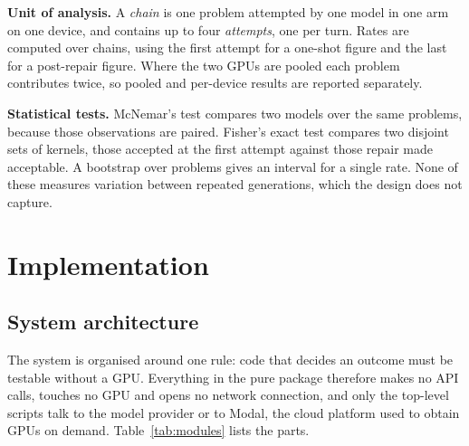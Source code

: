 \documentclass[12pt]{article}
\begin{document}
\textbf{Unit of analysis.} A \emph{chain} is one problem attempted by one model
in one arm on one device, and contains up to four \emph{attempts}, one per
turn. Rates are computed over chains, using the first attempt for a one-shot
figure and the last for a post-repair figure. Where the two GPUs are pooled
each problem contributes twice, so pooled and per-device results are reported
separately.

\textbf{Statistical tests.} McNemar's test compares two models over the same
problems, because those observations are paired. Fisher's exact test compares
two disjoint sets of kernels, those accepted at the first attempt against those
repair made acceptable. A bootstrap over problems gives an
interval for a single rate. None of these measures variation between repeated
generations, which the design does not capture.

\section{Implementation}

\subsection{System architecture}
\label{sec:architecture}

The system is organised around one rule: code that decides an outcome must be
testable without a GPU. Everything in the pure package therefore makes no API
calls, touches no GPU and opens no network connection, and only the top-level
scripts talk to the model provider or to Modal, the cloud platform used to
obtain GPUs on demand. Table~\ref{tab:modules} lists the parts.
\end{document}
